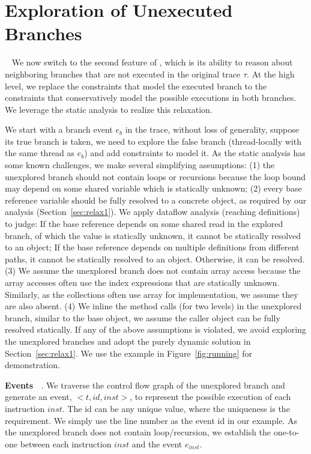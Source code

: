 \section{Exploration of Unexecuted Branches}~\label{sec:relax2}
We now switch to the second feature of \tool, which is its ability to reason about neighboring branches that are not executed in the original trace $\tau$.
At the high level, we replace the constraints that model the executed branch to the constraints that conservatively model the possible executions in both branches.
We leverage the static analysis to  realize this relaxation. 

We start with a branch event $e_b$ in the trace, without loss of generality, suppose its true branch is taken, we need to explore the false branch (thread-locally with the same thread as $e_b$) and add constraints to model it. As the static analysis has some known challenges, we make several simplifying assumptions: (1) the unexplored branch should not contain loops or recursions because the loop bound may depend on some shared variable which is statically unknown; (2) every base reference variable should be fully resolved to a concrete object, as required by our analysis (Section~\ref{sec:relax1}). We apply dataflow analysis (reaching definitions) to judge: If the base reference depends on some shared read in the explored branch, of which the value is statically unknown, it cannot be statically resolved to an object; If the base reference depends on multiple definitions from different paths, it cannot be statically resolved to an object. Otherwise, it can be resolved. (3) We assume the unexplored branch does not contain array access because the array accesses often use the index expressions that are statically unknown. Similarly, as the collections often use array for implementation, we assume they are also absent. (4) We inline the method calls (for two levels) in the unexplored branch, similar to the base object, we assume the caller object can be fully resolved statically.  If any of the above assumptions is violated, we  avoid exploring the unexplored branches and adopt the purely dynamic solution in Section~\ref{sec:relax1}. 
We use the example in Figure~\ref{fig:running} for demonstration.

{\bf Events \ }. We traverse the control flow graph of the unexplored branch and generate an event,  $<t, id, inst>$, to represent the possible execution of each instruction $inst$. The id can be any unique value, where the uniqueness is the requirement. We simply use the line number as the event id in our example. As the unexplored branch does not contain loop/recursion, we establish the one-to-one between each instruction $inst$ and the event $e_{inst}$.



